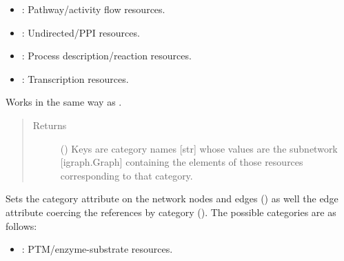 \documentclass[letterpaper,10pt,english]{sphinxmanual}
\begin{document}
\begin{fulllineitems}
\begin{fulllineitems}
\begin{itemize}
\item {} 
: Pathway/activity flow resources.

\item {} 
: Undirected/PPI resources.

\item {} 
: Process description/reaction resources.

\item {} 
: Transcription resources.

\end{itemize}

Works in the same way as {\hyperref[\detokenize{main:pypath.main.PyPath.separate}]{}}.
\begin{quote}\begin{description}
\item[{Returns}] \leavevmode
() \textendash{} Keys are category names {[}str{]} whose values are
the subnetwork {[}igraph.Graph{]} containing the elements of
those resources corresponding to that category.

\end{description}\end{quote}

\end{fulllineitems}


\begin{fulllineitems}
\label{\detokenize{main:pypath.main.PyPath.sequences}}
\end{fulllineitems}


\begin{fulllineitems}
\label{\detokenize{main:pypath.main.PyPath.set_boolean_vattr}}
\end{fulllineitems}


\begin{fulllineitems}
\label{\detokenize{main:pypath.main.PyPath.set_categories}}
Sets the category attribute on the network nodes and edges
() as well the edge attribute coercing the references
by category (). The possible categories are
as follows:
\begin{itemize}
\item {} 
: PTM/enzyme-substrate resources.


\end{itemize}
\end{fulllineitems}
\end{fulllineitems}
\end{document}
